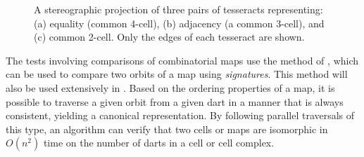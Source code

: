 \begin{figure}[tb]
\centering
{}
{}
{}
\caption[Three pairs of tesseracts]{A stereographic projection of three pairs of tesseracts representing: (a) equality (common 4-cell), (b) adjacency (a common 3-cell), and (c) common 2-cell. Only the edges of each tesseract are shown.}
\label{fig:tesseract-tests}
\end{figure}

The tests involving comparisons of combinatorial maps use the method of \citet{Gosselin11}, which can be used to compare two orbits of a map using \emph{signatures}.
This method will also be used extensively in .
Based on the ordering properties of a map, it is possible to traverse a given orbit from a given dart in a manner that is always consistent, yielding a canonical representation.
By following parallel traversals of this type, an algorithm can verify that two cells or maps are isomorphic in $O(n^2)$ time on the number of darts in a cell or cell complex.

